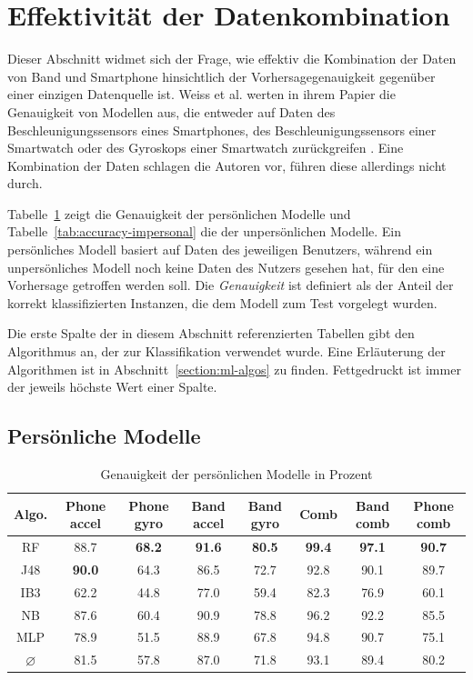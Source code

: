 \section{Effektivität der Datenkombination}
\label{sec:combination-effect}
Dieser Abschnitt widmet sich der Frage, wie effektiv die Kombination der Daten von Band und Smartphone hinsichtlich der Vorhersagegenauigkeit gegenüber einer einzigen Datenquelle ist. Weiss et al. werten in ihrem Papier die Genauigkeit von Modellen aus, die entweder auf Daten des Beschleunigungssensors eines Smartphones, des Beschleunigungssensors einer Smartwatch oder des Gyroskops einer Smartwatch zurückgreifen \cite{Weiss2016}. Eine Kombination der Daten schlagen die Autoren vor, führen diese allerdings nicht durch.

Tabelle~\ref{tab:accuracy-personal} zeigt die Genauigkeit der persönlichen Modelle und Tabelle~\ref{tab:accuracy-impersonal} die der unpersönlichen Modelle. Ein persönliches Modell basiert auf Daten des jeweiligen Benutzers, während ein unpersönliches Modell noch keine Daten des Nutzers gesehen hat, für den eine Vorhersage getroffen werden soll. Die \textit{Genauigkeit} ist definiert als der Anteil der korrekt klassifizierten Instanzen, die dem Modell zum Test vorgelegt wurden.

Die erste Spalte der in diesem Abschnitt referenzierten Tabellen gibt den Algorithmus an, der zur Klassifikation verwendet wurde. Eine Erläuterung der Algorithmen ist in Abschnitt~\ref{section:ml-algos}
zu finden. Fettgedruckt ist immer der jeweils höchste Wert einer Spalte.

\subsection{Persönliche Modelle}

\begin{table}
	\centering
	\footnotesize
	\begin{tabular}{|c|c|c|c|c|c|c|c|}
		\hline 
		\textbf{Algo.} & \textbf{Phone accel} & \textbf{Phone gyro} & \textbf{Band accel} & \textbf{Band gyro} & \textbf{Comb} & \textbf{Band comb} & \textbf{Phone comb} \\ 
		\hline 
		RF & 88.7 & \textbf{68.2} & \textbf{91.6} & \textbf{80.5} & \textbf{99.4} & \textbf{97.1} & \textbf{90.7} \\ 
		J48 & \textbf{90.0} & 64.3 & 86.5 & 72.7 & 92.8 & 90.1 & 89.7 \\ 
		IB3 & 62.2 & 44.8 & 77.0 & 59.4 & 82.3 & 76.9 & 60.1 \\ 
		NB & 87.6 & 60.4 & 90.9 & 78.8 & 96.2 & 92.2 & 85.5 \\ 
		MLP & 78.9 & 51.5 & 88.9 & 67.8 & 94.8 & 90.7 & 75.1 \\ 
		\hline 
		$\varnothing$ & 81.5 & 57.8 & 87.0 & 71.8 & 93.1 & 89.4 & 80.2 \\ 
		\hline 
	\end{tabular}
	\caption{Genauigkeit der persönlichen Modelle in Prozent}
	\label{tab:accuracy-personal}
\end{table}

